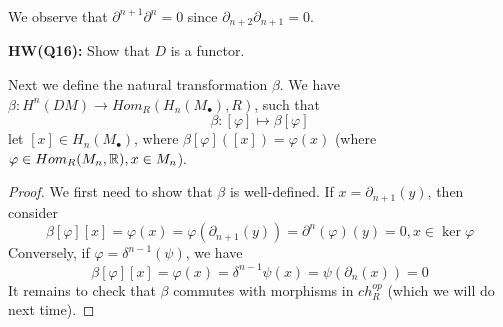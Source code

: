 We observe that $\partial^{n+1}\partial^n=0$ since $\partial_{n+2}\partial_{n+1}=0$.
\begin{prob}
    \textbf{HW(Q16):} Show that $D$ is a functor.
\end{prob}
Next we define the natural transformation $\beta$. We have $\beta: H^n(DM)\to Hom_R(H_n(M_\bullet),R)$, such that 
\begin{equation*}
    \beta: [\varphi]\mapsto \beta[\varphi]
\end{equation*}
let $[x]\in H_n(M_\bullet)$, where $\beta[\varphi]([x])=\varphi(x)$ (where $\varphi\in Hom_R(M_n,\mathbb{R}), x\in M_n$).
\begin{proof}
    We first need to show that $\beta$ is well-defined. If $x=\partial_{n+1}(y)$, then consider 
    \begin{equation*}
        \beta[\varphi][x]=\varphi(x)=\varphi(\partial_{n+1}(y))=\partial^n(\varphi)(y)=0, x\in\ker\varphi
    \end{equation*}
    Conversely, if $\varphi=\delta^{n-1}(\psi)$, we have 
    \begin{equation*}
        \beta[\varphi][x]=\varphi(x)=\delta^{n-1}\psi(x)=\psi(\partial_n(x))=0
    \end{equation*}
    It remains to check that $\beta$ commutes with morphisms in $ch_R^{op}$ (which we will do next time).
\end{proof}






